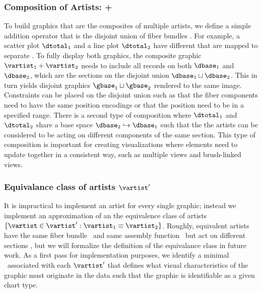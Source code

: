 \documentclass[../main.tex]{subfiles}
\begin{document}
\subsubsection{Composition of Artists: +}
To build graphics that are the composites of multiple artists, we define a simple addition operator that is the disjoint union of fiber bundles \dtotal.  For example, a scatter plot $\dtotal_1$ and a line plot $\dtotal_2$ have different \dbase that are mapped to separate \gbase. To fully display both graphics, the composite graphic $\vartist_1 + \vartist_2$ needs to include all records on both $\dbase_1$ and $\dbase_2$, which are the sections on the disjoint union $\dbase_1 \sqcup \dbase_2$. This in turn yields disjoint graphics $\gbase_1 \sqcup \gbase_2$ rendered to the same image. Constraints can be placed on the disjoint union such as that the fiber components need to have the same \vchannel position encodings or that the position \vsection need to be in a specified range. There is a second type of composition where $\dtotal_1$ and $\dtotal_2$ share a base space $\dbase_2 \hookrightarrow \dbase_1$ such that the the artists can be considered to be acting on different components of the same section. This type of composition is important for creating visualizations where elements need to update together in a consistent way, such as multiple views \cite{alboRadarComparativeEvaluation2016a, hullmanKeeping2018} and brush-linked views\cite{beckerBrushingScatterplots1987,bujaInteractiveData1991}. 

\subsubsection{Equivalance class of artists $\vartist^{\prime}$}
\label{sec:artist_equivalance}
It is impractical to implement an artist for every single graphic; instead we implement an approximation of an the equivalence class of artists $\{\vartist \in \vartist^{\prime}: \vartist_{1} \equiv \vartist_{2}\}$. Roughly, equivalent artists have the same fiber bundle \vtotal\ and same assembly function \vmark\ but act on different sections \vsection, but we will formalize the definition of the equivalance class in future work. As a first pass for implementation purposes, we identify a minimal \vfiber\ associated with each $\vartist^{\prime}$ that defines what visual characteristics of the graphic must originate in the data such that the graphic is identifiable as a given chart type.
\end{document}
